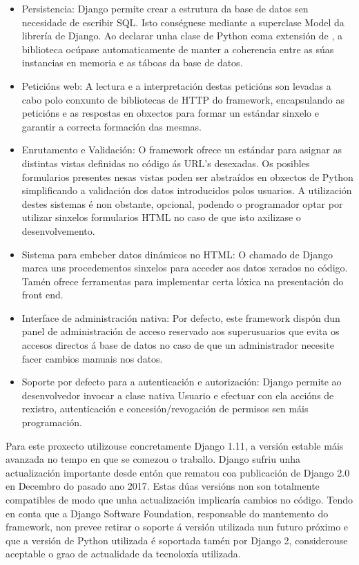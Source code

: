 \begin{itemize}
	
	\item Persistencia: Django permite crear a estrutura da base de datos sen necesidade de escribir SQL. Isto 
	conséguese mediante a superclase Model da librería  de Django. Ao declarar unha clase de Python coma
	extensión de , a biblioteca ocúpase automaticamente de manter a coherencia entre as súas instancias en 
	memoria e as táboas da base de datos. 
	
	\item Peticións web: A lectura e a interpretación destas peticións son levadas a cabo polo conxunto de bibliotecas
	de HTTP do framework, encapsulando as peticións e as respostas en obxectos para formar un estándar sinxelo e garantir
	a correcta formación das mesmas.
	
	\item Enrutamento e Validación: O framework ofrece un estándar para asignar as distintas vistas definidas no código
	ás URL's desexadas. Os posibles formularios presentes nesas vistas poden ser abstraídos en obxectos de Python 
	simplificando a validación dos datos introducidos polos usuarios. A utilización destes sistemas é non obstante, 
	opcional, podendo o programador optar por utilizar sinxelos formularios HTML no caso de que isto axilizase 
	o desenvolvemento.
	
	\item Sistema para embeber datos dinámicos no HTML: O chamado  de Django marca uns procedementos
	sinxelos para acceder aos datos xerados no código. Tamén ofrece ferramentas para implementar certa lóxica
	na presentación do front end.
	
	\item Interface de administración nativa: Por defecto, este framework dispón dun panel de administración de acceso
	reservado aos superusuarios que evita os accesos directos á base de datos no caso de que un administrador necesite
	facer cambios manuais nos datos.
	
	\item Soporte por defecto para a autenticación e autorización: Django permite ao desenvolvedor invocar a clase 
	nativa Usuario e efectuar con ela accións de rexistro, autenticación e concesión/revogación de permisos sen máis
	programación.

\end{itemize}   


Para este proxecto utilizouse concretamente Django 1.11, a versión estable máis avanzada no tempo en que se comezou o 
traballo. Django sufriu unha actualización importante desde entón que rematou coa publicación de Django 2.0 en Decembro do pasado ano 2017. Estas dúas versións non son totalmente compatibles de modo que unha actualización implicaría cambios no 
código. Tendo en conta que a Django Software Foundation, responsable do mantemento do framework, non prevee retirar o soporte á versión utilizada nun futuro próximo e que a versión de Python utilizada é soportada tamén por Django 2\cite{django2}, considerouse aceptable o grao de actualidade da tecnoloxía utilizada.    

